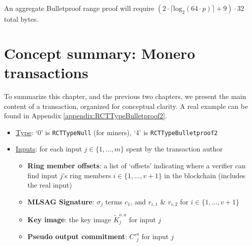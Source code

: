 An aggregate Bulletproof range proof will require $(2 \cdot \lceil \textrm{log}_2(64 \cdot p) \rceil + 9) \cdot 32$ total bytes.



\newpage
\section{Concept summary: Monero transactions}
\label{sec:transaction_summary}

To summarize this chapter, and the previous two chapters, we present the main content of a transaction, organized for conceptual clarity. A real example can be found in Appendix \ref{appendix:RCTTypeBulletproof2}.

\begin{itemize}
    \item \underline{Type}: `0' is {\tt RCTTypeNull} (for miners), `4' is {\tt RCTTypeBulletproof2} %
    \item \underline{Inputs}: for each input $j \in \{1,...,m\}$ spent by the transaction author
    \begin{itemize}
        \item \textbf{Ring member offsets}: a list of `offsets' indicating where a verifier can find input $j$'s ring members $i \in \{1,...,v+1\}$ in the blockchain (includes the real input)
        \item \textbf{MLSAG Signature}: $\sigma_j$ terms $c_1$, and $r_{i,1}$ \& $r_{i,2}$ for $i \in \{1,...,v+1\}$
        \item \textbf{Key image}: the key image $\tilde{K}^{o,a}_j$ for input $j$
        \item \textbf{Pseudo output commitment}: $C'^{a}_j$ for input $j$
    \end{itemize}
    

\end{itemize}
